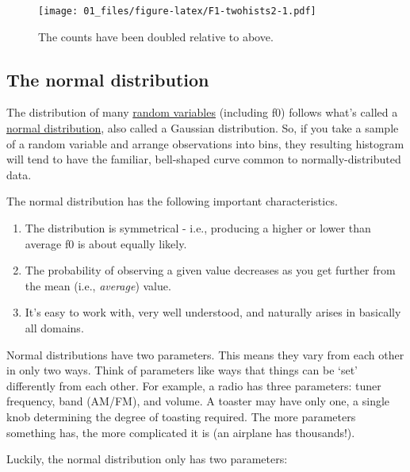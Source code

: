 \documentclass[
]{book}
\begin{document}
\begin{figure}
\centering
\texttt{[image: 01\_files/figure-latex/F1-twohists2-1.pdf]}
\caption{\label{fig:F1-twohists2}The counts have been doubled relative to above.}
\end{figure}

\hypertarget{the-normal-distribution}{%
\subsection{The normal distribution}\label{the-normal-distribution}}

The distribution of many \href{https://www.youtube.com/watch?v=4HpvBZnHOVI}{random variables} (including f0) follows what's called a \href{https://en.wikipedia.org/wiki/Normal_distribution}{normal distribution}, also called a Gaussian distribution. So, if you take a sample of a random variable and arrange observations into bins, they resulting histogram will tend to have the familiar, bell-shaped curve common to normally-distributed data.

The normal distribution has the following important characteristics.

\begin{enumerate}
\def\labelenumi{\arabic{enumi}.}
\item
  The distribution is symmetrical - i.e., producing a higher or lower than average f0 is about equally likely.
\item
  The probability of observing a given value decreases as you get further from the mean (i.e., \emph{average}) value.
\item
  It's easy to work with, very well understood, and naturally arises in basically all domains.
\end{enumerate}

Normal distributions have two parameters. This means they vary from each other in only two ways. Think of parameters like ways that things can be `set' differently from each other. For example, a radio has three parameters: tuner frequency, band (AM/FM), and volume. A toaster may have only one, a single knob determining the degree of toasting required. The more parameters something has, the more complicated it is (an airplane has thousands!).

Luckily, the normal distribution only has two parameters:
\end{document}
